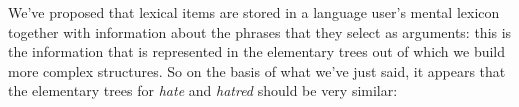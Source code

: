 \documentclass{article}
\begin{document}
We've proposed that lexical items are stored in a language user's mental lexicon together with information about the phrases that they select as arguments: this is the information that is represented in the elementary trees out of which we build more complex structures.  So on the basis of what we've just said, it appears that the elementary trees for \emph{hate} and \emph{hatred} should be very similar:
\begin{exe}
\end{exe}
\end{document}
